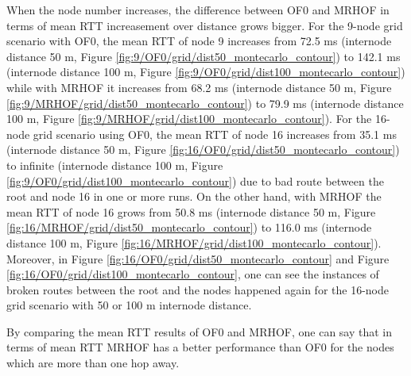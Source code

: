 When the node number increases, the difference between OF0 and MRHOF in terms of mean RTT increasement over distance grows bigger. For the 9-node grid scenario with OF0, the mean RTT of node 9 increases from 72.5 ms (internode distance 50 m, Figure \ref{fig:9/OF0/grid/dist50_montecarlo_contour}) to 142.1 ms (internode distance 100 m, Figure \ref{fig:9/OF0/grid/dist100_montecarlo_contour}) while with MRHOF it increases from 68.2 ms (internode distance 50 m, Figure \ref{fig:9/MRHOF/grid/dist50_montecarlo_contour}) to 79.9 ms (internode distance 100 m, Figure \ref{fig:9/MRHOF/grid/dist100_montecarlo_contour}). For the 16-node grid scenario using OF0, the mean RTT of node 16 increases from 35.1 ms (internode distance 50 m, Figure \ref{fig:16/OF0/grid/dist50_montecarlo_contour}) to infinite (internode distance 100 m, Figure \ref{fig:9/OF0/grid/dist100_montecarlo_contour}) due to bad route between the root and node 16 in one or more runs. On the other hand, with MRHOF the mean RTT of node 16 grows from 50.8 ms (internode distance 50 m, Figure \ref{fig:16/MRHOF/grid/dist50_montecarlo_contour}) to 116.0 ms (internode distance 100 m, Figure \ref{fig:16/MRHOF/grid/dist100_montecarlo_contour}). Moreover, in Figure \ref{fig:16/OF0/grid/dist50_montecarlo_contour} and Figure \ref{fig:16/OF0/grid/dist100_montecarlo_contour}, one can see the instances of broken routes between the root and the nodes happened again for the 16-node grid scenario with 50 or 100 m internode distance. 

By comparing the mean RTT results of OF0 and MRHOF, one can say that in terms of mean RTT MRHOF has a better performance than OF0 for the nodes which are more than one hop away. 

